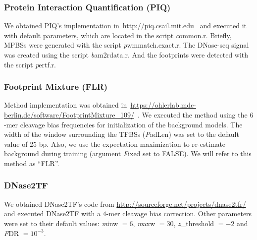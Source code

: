 \subsubsection{Protein Interaction Quantification (PIQ)}

We obtained PIQ's implementation in~\url{http://piq.csail.mit.edu}~\citep{sherwood2014} and executed it with default parameters, which are located in the script {\emph common.r}. Briefly, MPBSs were generated with the script {\emph pwmmatch.exact.r}. The DNase-seq signal was created using the script {\emph bam2rdata.r}. And the footprints were detected with the script {\emph pertf.r}.

\subsubsection{Footprint Mixture (FLR)}

Method implementation was obtained in~\url{https://ohlerlab.mdc-berlin.de/software/FootprintMixture_109/}~\citep{yardimci2014}. We executed the method using the $6$-mer cleavage bias frequencies for initialization of the background models. The width of the window surrounding the TFBSs ({\emph PadLen}) was set to the default value of $25$ bp. Also, we use the expectation maximization to re-estimate background during training (argument {\emph Fixed} set to FALSE). We will refer to this method as ``FLR''.

\subsubsection{DNase2TF}

We obtained DNase2TF's code from \url{http://sourceforge.net/projects/dnase2tfr/} \citep{sung2014} and executed DNase2TF with a $4$-mer cleavage bias correction. Other parameters were set to their default values: {\emph minw} $= 6$, {\emph maxw} $= 30$, {\emph z\_threshold} $= -2$ and {\emph FDR} $= 10^{-3}$.

